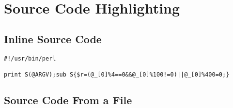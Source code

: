 \documentclass{article}
\begin{document}
\section{Source Code Highlighting}

\subsection{Inline Source Code}

\begin{lstlisting}
#!/usr/bin/perl

print S(@ARGV);sub S{$r=(@_[0]%4==0&&@_[0]%100!=0)||@_[0]%400=0;}
\end{lstlisting}


\subsection{Source Code From a File}


\end{document}
